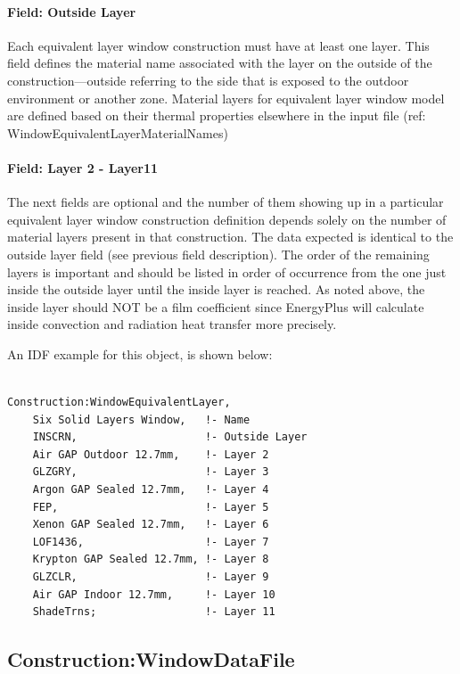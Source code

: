 \paragraph{Field: Outside Layer}\label{field-outside-layer-2}

Each equivalent layer window construction must have at least one layer. This field defines the material name associated with the layer on the outside of the construction---outside referring to the side that is exposed to the outdoor environment or another zone. Material layers for equivalent layer window model are defined based on their thermal properties elsewhere in the input file (ref: WindowEquivalentLayerMaterialNames)

\paragraph{Field: Layer 2 - Layer11}\label{field-layer-2---layer11}

The next fields are optional and the number of them showing up in a particular equivalent layer window construction definition depends solely on the number of material layers present in that construction. The data expected is identical to the outside layer field (see previous field description). The order of the remaining layers is important and should be listed in order of occurrence from the one just inside the outside layer until the inside layer is reached. As noted above, the inside layer should NOT be a film coefficient since EnergyPlus will calculate inside convection and radiation heat transfer more precisely.

An IDF example for this object, is shown below:

\begin{lstlisting}

Construction:WindowEquivalentLayer,
    Six Solid Layers Window,   !- Name
    INSCRN,                    !- Outside Layer
    Air GAP Outdoor 12.7mm,    !- Layer 2
    GLZGRY,                    !- Layer 3
    Argon GAP Sealed 12.7mm,   !- Layer 4
    FEP,                       !- Layer 5
    Xenon GAP Sealed 12.7mm,   !- Layer 6
    LOF1436,                   !- Layer 7
    Krypton GAP Sealed 12.7mm, !- Layer 8
    GLZCLR,                    !- Layer 9
    Air GAP Indoor 12.7mm,     !- Layer 10
    ShadeTrns;                 !- Layer 11
\end{lstlisting}

\subsection{Construction:WindowDataFile}\label{constructionwindowdatafile}

